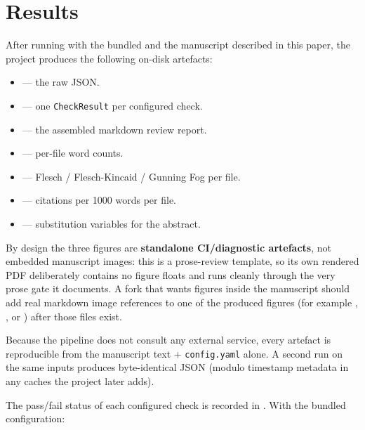 \documentclass[
  english,
]{article}
\providecommand{\tightlist}{%
  \setlength{\itemsep}{0pt}\setlength{\parskip}{0pt}}
\begin{document}
\newpage

\section{Results}\label{sec:results}

After running  with the bundled
 and the manuscript described in this
paper, the project produces the following on-disk artefacts:

\begin{itemize}
\tightlist
\item
   --- the raw
   JSON.
\item
   --- one \texttt{CheckResult} per
  configured check.
\item
   --- the assembled markdown review
  report.
\item
   --- per-file word
  counts.
\item
   --- Flesch /
  Flesch-Kincaid / Gunning Fog per file.
\item
   --- citations per 1000 words
  per file.
\item
   --- substitution
  variables for the abstract.
\end{itemize}

By design the three figures are \textbf{standalone CI/diagnostic
artefacts}, not embedded manuscript images: this is a prose-review
template, so its own rendered PDF deliberately contains no figure floats
and runs cleanly through the very prose gate it documents. A fork that
wants figures inside the manuscript should add real markdown image
references to one of the produced figures (for example
,
, or
) after those files exist.

Because the pipeline does not consult any external service, every
artefact is reproducible from the manuscript text + \texttt{config.yaml}
alone. A second run on the same inputs produces byte-identical JSON
(modulo timestamp metadata in any caches the project later adds).

The pass/fail status of each configured check is recorded in
. With the bundled configuration:
\end{document}
